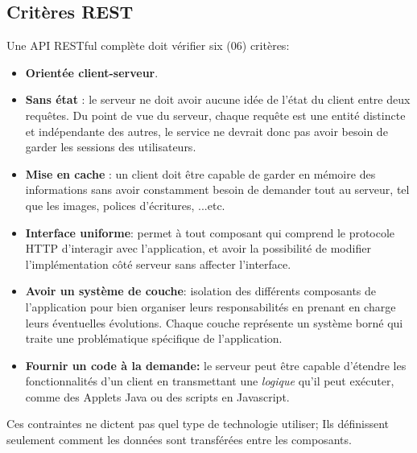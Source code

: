 \newpage
\subsection{Critères REST}
Une API RESTful complète doit vérifier six (06) critères: \cite{refTutorialPointsREST}
\begin{itemize}
	\item \textbf{Orientée client-serveur}.
	      
	\item \textbf{Sans état} : le serveur ne doit avoir aucune idée de l'état du client entre deux requêtes. Du point de vue du serveur, chaque requête est une entité distincte et indépendante des autres, le service ne devrait donc pas avoir besoin de garder les sessions des utilisateurs.
	      
	\item \textbf{Mise en cache} : un client doit être capable de garder en mémoire des informations sans avoir constamment besoin de demander tout au serveur, tel que les images, polices d'écritures, ...etc.
	      
	\item \textbf{Interface uniforme}: permet à tout composant qui comprend le protocole HTTP d'interagir avec l'application, et avoir la possibilité de modifier l'implémentation côté serveur sans affecter l'interface.
	      
	\item \textbf{Avoir un système de couche}: isolation des différents composants de l'application pour bien organiser leurs responsabilités en prenant en charge leurs éventuelles évolutions. Chaque couche représente un système borné qui traite une problématique spécifique de l'application.
	      
	\item \textbf{Fournir un code à la demande: } le serveur peut être capable d'étendre les fonctionnalités d'un client en transmettant une \emph{logique} qu'il peut exécuter, comme des Applets Java ou des scripts en Javascript.
	      
\end{itemize}
Ces contraintes ne dictent pas quel type de technologie utiliser; Ils définissent seulement comment les données sont transférées entre les composants.

